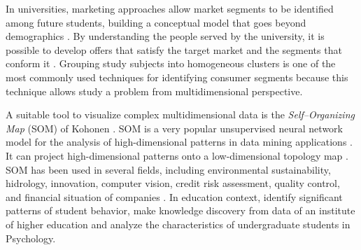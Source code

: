 \documentclass[5p,authoryear,preprint,12pt]{elsarticle}
\begin{document}
In universities, marketing approaches allow market segments to be identified among future students, building a conceptual model that goes beyond demographics \citep{angulo2010market}. By understanding the people served by the university, it is possible to develop offers that satisfy the target market \citep{lewison2007student} and the segments that conform it \citep{bloom2005market}. Grouping study subjects into homogeneous clusters is one of the most commonly used techniques for identifying consumer segments \citep{saarenvirta1998mining, davari2019data} because this technique allows study a problem from multidimensional perspective.

A suitable tool to visualize complex multidimensional data is the \textit{Self--Organizing Map} (SOM) of Kohonen \citep{kohonen1995springer,kohonen1982self}. SOM is a very popular unsupervised neural network model for the analysis of high-dimensional patterns in data mining applications \citep{shieh2012new}. It can project
high-dimensional patterns onto a low-dimensional topology map \citep{shieh2012new}. SOM has been used in several fields, including environmental sustainability, hidrology, innovation, computer vision, credit risk assessment, quality control, and financial situation of companies \citep{mostafa2010clustering,haselbeck2019self, segev2012identification,hajek2014visualising,ortega2016smart, bao2019integration,alkahtani2019decision,chen2013clustering}. In education context, \citet{alias2006student} identify significant patterns of student behavior, \citet{saadatdoost2011application} make knowledge discovery from data of an institute of higher education and \citet{nogales2019competencies} analyze the characteristics of undergraduate students in Psychology.  %
\end{document}
